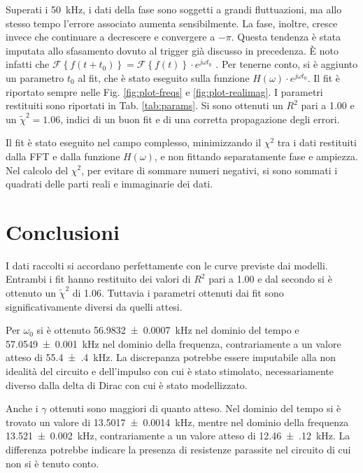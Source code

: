 \documentclass[12pt,a4paper, twocolumn]{article}
\newcommand{\fourier}[1]{\mathcal{F}\left\{#1\right\}}
\begin{document}
Superati i \SI{50}{\kilo\hertz}, i dati della fase sono soggetti a grandi fluttuazioni, ma allo stesso tempo l'errore associato aumenta sensibilmente. La fase, inoltre, cresce invece che continuare a decrescere e convergere a $-\pi$. Questa tendenza è stata imputata allo sfasamento dovuto al trigger già discusso in precedenza. È noto infatti che $\fourier{f(t+t_0)} = \fourier{f(t)} \cdot e^{j \omega t_0}$ \cite{fourier}. Per tenerne conto, si è aggiunto un parametro $t_0$ al fit, che è stato eseguito sulla funzione $H(\omega) \cdot e^{j \omega t_0}$. Il fit è riportato sempre nelle Fig. \ref{fig:plot-freqs} e \ref{fig:plot-realimag}. I parametri restituiti sono riportati in Tab. \ref{tab:params}. Si sono ottenuti un $R^2$ pari a 1.00 e un $\tilde{\chi}^2 = 1.06$, indici di un buon fit e di una corretta propagazione degli errori.

Il fit è stato eseguito nel campo complesso, minimizzando il $\chi^2$ tra i dati restituiti dalla FFT e dalla funzione $H(\omega)$, e non fittando separatamente fase e ampiezza. Nel calcolo del $\chi^2$, per evitare di sommare numeri negativi, si sono sommati i quadrati delle parti reali e immaginarie dei dati.

\section{Conclusioni}

I dati raccolti si accordano perfettamente con le curve previste dai modelli. Entrambi i fit hanno restituito dei valori di $R^2$ pari a 1.00 e dal secondo si è ottenuto un $\tilde{\chi}^2$ di 1.06. Tuttavia i parametri ottenuti dai fit sono significativamente diversi da quelli attesi.

Per $\omega_0$ si è ottenuto \SI{56.9832(7)}{\kilo\hertz} nel dominio del tempo e \SI{57.0549(10)}{\kilo\hertz} nel dominio della frequenza, contrariamente a un valore atteso di \SI{55.4(4)}{\kilo\hertz}. La discrepanza potrebbe essere imputabile alla non idealità del circuito e dell'impulso con cui è stato stimolato, necessariamente diverso dalla delta di Dirac con cui è stato modellizzato.

Anche i $\gamma$ ottenuti sono maggiori di quanto atteso. Nel dominio del tempo si è trovato un valore di \SI{13.5017(14)}{\kilo\hertz}, mentre nel dominio della frequenza \SI{13.521(2)}{\kilo\hertz}, contrariamente a un valore atteso di \SI{12.46(12)}{\kilo\hertz}. La differenza potrebbe indicare la presenza di resistenze parassite nel circuito di cui non si è tenuto conto.
\end{document}
